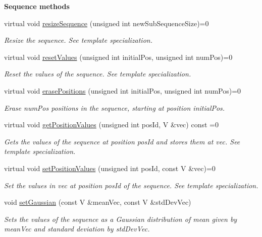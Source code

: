 \begin{Indent}{\bf Sequence methods}
\begin{DoxyCompactItemize}
virtual void \hyperlink{class_q_u_e_s_o_1_1_base_vector_sequence_adc238af7f6e8af2402ab791de7d60af5}{resize\-Sequence} (unsigned int new\-Sub\-Sequence\-Size)=0
\begin{DoxyCompactList}\small\item\em Resize the sequence. See template specialization. \end{DoxyCompactList}\item 
virtual void \hyperlink{class_q_u_e_s_o_1_1_base_vector_sequence_ab007ea121708b1b1a63553433b428413}{reset\-Values} (unsigned int initial\-Pos, unsigned int num\-Pos)=0
\begin{DoxyCompactList}\small\item\em Reset the values of the sequence. See template specialization. \end{DoxyCompactList}\item 
virtual void \hyperlink{class_q_u_e_s_o_1_1_base_vector_sequence_a2b41ed436f95a1816a811fc368adaf79}{erase\-Positions} (unsigned int initial\-Pos, unsigned int num\-Pos)=0
\begin{DoxyCompactList}\small\item\em Erase {\ttfamily num\-Pos} positions in the sequence, starting at position {\ttfamily initial\-Pos}. \end{DoxyCompactList}\item 
virtual void \hyperlink{class_q_u_e_s_o_1_1_base_vector_sequence_a656d47a18b401d6d914b0daf2dea88b0}{get\-Position\-Values} (unsigned int pos\-Id, V \&vec) const =0
\begin{DoxyCompactList}\small\item\em Gets the values of the sequence at position {\ttfamily pos\-Id} and stores them at {\ttfamily vec}. See template specialization. \end{DoxyCompactList}\item 
virtual void \hyperlink{class_q_u_e_s_o_1_1_base_vector_sequence_a5bcce98b68e0e24c05136e7a3bb50c12}{set\-Position\-Values} (unsigned int pos\-Id, const V \&vec)=0
\begin{DoxyCompactList}\small\item\em Set the values in {\ttfamily vec} at position {\ttfamily pos\-Id} of the sequence. See template specialization. \end{DoxyCompactList}\item 
void \hyperlink{class_q_u_e_s_o_1_1_base_vector_sequence_aa1081248d23a2b18307962993892eb4c}{set\-Gaussian} (const V \&mean\-Vec, const V \&std\-Dev\-Vec)
\begin{DoxyCompactList}\small\item\em Sets the values of the sequence as a Gaussian distribution of mean given by {\ttfamily mean\-Vec} and standard deviation by {\ttfamily std\-Dev\-Vec}. \end{DoxyCompactList}\item 

\end{DoxyCompactItemize}
\end{Indent}
